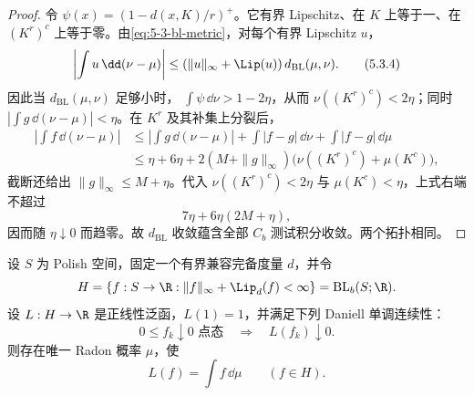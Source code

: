 \begin{proof}
令 $\psi(x)=(1-d(x,K)/r)^+$。它有界 Lipschitz、在 $K$ 上等于一、在
$(K^r)^c$ 上等于零。由\eqref{eq:5-3-bl-metric}，对每个有界 Lipschitz $u$，
\[
 \left|\int u\,\dd(\nu-\mu)\right|
 \le(\|u\|_\infty+\Lip(u))\,d_{\mathrm{BL}}(\mu,\nu).
 \tag{5.3.4}\label{eq:5-3-bl-scaled}
\]
因此当 $d_{\mathrm{BL}}(\mu,\nu)$ 足够小时，
$\int\psi\,\dd\nu>1-2\eta$，从而 $\nu((K^r)^c)<2\eta$；同时
$|\int g\,\dd(\nu-\mu)|<\eta$。在 $K^r$ 及其补集上分裂后，
\[
\begin{aligned}
 \left|\int f\,\dd(\nu-\mu)\right|
 &\le\left|\int g\,\dd(\nu-\mu)\right|
   +\int|f-g|\,\dd\nu+\int|f-g|\,\dd\mu\\
 &\le \eta+6\eta
   +2(M+\|g\|_\infty)\bigl(\nu((K^r)^c)+\mu(K^c)\bigr),
\end{aligned}
\]
截断还给出 $\|g\|_\infty\le M+\eta$。代入
$\nu((K^r)^c)<2\eta$ 与 $\mu(K^c)<\eta$，上式右端不超过
\[
 7\eta+6\eta(2M+\eta),
\]
因而随 $\eta\downarrow0$ 而趋零。故 $d_{\mathrm{BL}}$ 收敛蕴含全部
$C_b$ 测试积分收敛。两个拓扑相同。
\end{proof}


\begin{proposition}\label{proposition:5-3-3-dc-step}
设 $S$ 为 Polish 空间，固定一个有界兼容完备度量 $d$，并令
\[
 H=\{f:S\to\R:\|f\|_\infty+\Lip_d(f)<\infty\}
   =\mathrm{BL}_b(S;\R).
\]
设
$L:H\to\R$ 是正线性泛函，$L(1)=1$，并满足下列 Daniell 单调连续性：
\[
 0\le f_k\downarrow0\text{ 点态}
 \quad\Longrightarrow\quad
 L(f_k)\downarrow0.
 \tag{5.3.5}\label{eq:5-3-daniell-continuity}
\]
则存在唯一 Radon 概率 $\mu$，使
\[
 L(f)=\int f\,\dd\mu\qquad(f\in H).
\]
\end{proposition}

